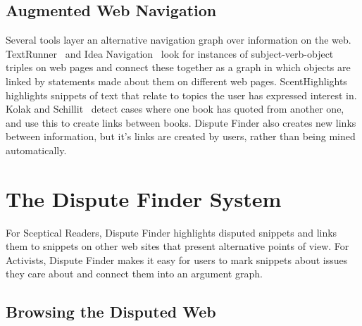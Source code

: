 \documentclass{www2010-submission}
\newcommand{\todo}[1]{}
\begin{document}
\todo{Ask Nicholas if he would like to read the paper}

\subsection{Augmented Web Navigation}

Several tools layer an alternative navigation graph over information on the web. TextRunner~\cite{Etzioni2008} and Idea Navigation~\cite{Etzioni2008} look for instances of subject-verb-object triples on web pages and connect these together as a graph in which objects are linked by statements made about them on different web pages. ScentHighlights~\cite{Chi2005a} highlights snippets of text that relate to topics the user has expressed interest in. Kolak and Schillit~\cite{Kolak2008} detect cases where one book has quoted from another one, and use this to create links between books. Dispute Finder also creates new links between information, but it's links are created by users, rather than being mined automatically.


% 

% 

\section{The Dispute Finder System}

For Sceptical Readers, Dispute Finder highlights disputed snippets and links them to snippets on other web sites that present alternative points of view. For Activists, Dispute Finder makes it easy for users to mark snippets about issues they care about and connect them into an argument graph.

\subsection{Browsing the Disputed Web}
\end{document}
